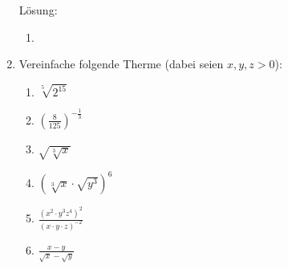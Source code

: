 \documentclass[../main.tex]{subfiles}
\begin{document}
\begin{enumerate}
	      Lösung:
	      \begin{enumerate}
		      \item
	      \end{enumerate}
	\item
	      Vereinfache folgende Therme (dabei seien \begin{math}
		      x, y, z > 0
	      \end{math}):
	      \begin{enumerate}
		      \item \begin{math}
			            \sqrt[5]{2^{15}}
		            \end{math}
		      \item \begin{math}
			            (\frac{8}{125})^{-\frac{1}{3}}
		            \end{math}
		      \item \begin{math}
			            \sqrt{\sqrt[3]{x}}
		            \end{math}
		      \item \begin{math}
			            (\sqrt[3]{x} \cdot \sqrt{y^3})^6
		            \end{math}
		      \item \begin{math}
			            \frac{(x^2 \cdot y^3 z^4)^2}{
				            (x \cdot y \cdot z)^{-2}
			            }
		            \end{math}
		      \item \begin{math}
			            \frac{x - y}{ \sqrt{x} - \sqrt{y} }
		            \end{math}
	      \end{enumerate}


\end{enumerate}
\end{document}
